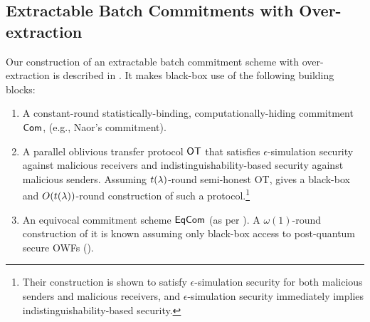 \subsection{Extractable Batch Commitments with Over-extraction}\label{sec:construction_OverExtBCom} 
Our construction of an extractable batch commitment scheme with over-extraction is described in . It makes black-box use of the following building blocks:
\begin{enumerate}
\item 
A constant-round statistically-binding, computationally-hiding commitment $\mathsf{Com}$, (e.g., Naor's commitment). 
\item A parallel oblivious transfer protocol $\mathsf{OT}$ that satisfies $\epsilon$-simulation security against malicious receivers and indistinguishability-based security against malicious senders.   
Assuming $t(\lambda)$-round semi-honest OT,  \cite{C:CCLY22} gives a black-box and $O(t(\lambda))$-round construction of such a protocol.\footnote{Their construction is shown to satisfy $\epsilon$-simulation security for both malicious senders and malicious receivers, and  $\epsilon$-simulation security immediately implies indistinguishability-based security.} 

\item An equivocal commitment scheme $\mathsf{EqCom}$ (as per ). 
A $\omega(1)$-round construction of it is known assuming only black-box access to post-quantum secure OWFs ().  
\end{enumerate}
